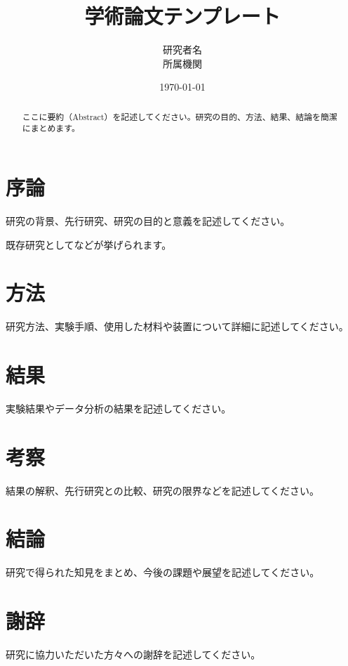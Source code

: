 \documentclass[12pt]{ltjsarticle}
\title{学術論文テンプレート}
\author{研究者名\\所属機関}
\date{\today}
\begin{document}
\maketitle

\begin{abstract}
ここに要約（Abstract）を記述してください。研究の目的、方法、結果、結論を簡潔にまとめます。
\end{abstract}

\section{序論}
研究の背景、先行研究、研究の目的と意義を記述してください。

既存研究として\cite{fujita2020}などが挙げられます。

\section{方法}
研究方法、実験手順、使用した材料や装置について詳細に記述してください。

\section{結果}
実験結果やデータ分析の結果を記述してください。

\section{考察}
結果の解釈、先行研究との比較、研究の限界などを記述してください。

\section{結論}
研究で得られた知見をまとめ、今後の課題や展望を記述してください。

\section*{謝辞}
研究に協力いただいた方々への謝辞を記述してください。

\printbibliography[title=参考文献]
\end{document}
